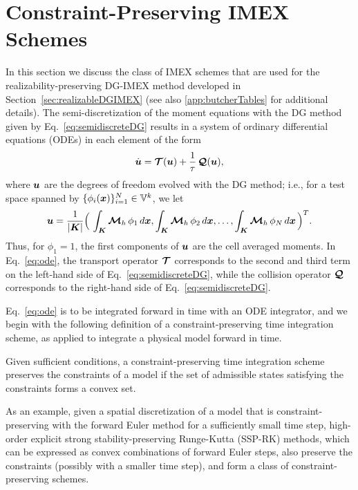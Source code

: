 \section{Constraint-Preserving IMEX Schemes}
\label{sec:imex}

In this section we discuss the class of IMEX schemes that are used for the realizability-preserving DG-IMEX method developed in Section~\ref{sec:realizableDGIMEX} (see also \ref{app:butcherTables} for additional details).  
The semi-discretization of the moment equations with the DG method given by Eq.~\eqref{eq:semidiscreteDG} results in a system of ordinary differential equations (ODEs) in each element of the form
\begin{equation}
  \dot{\boldsymbol{u}}
  =\boldsymbol{\mathcal{T}}(\boldsymbol{u})+\frac{1}{\tau}\,\boldsymbol{\mathcal{Q}}(\boldsymbol{u}),
  \label{eq:ode}
\end{equation}
where $\boldsymbol{u}$ are the degrees of freedom evolved with the DG method; i.e., for a test space spanned by $\{\phi_{i}(\boldsymbol{x})\}_{i=1}^{N}\in\mathbb{V}^{k}$, we let
\begin{equation}
  \boldsymbol{u}=\frac{1}{|\boldsymbol{K}|}\Big(\,\int_{\boldsymbol{K}}\boldsymbol{\mathcal{M}}_{h}\,\phi_{1}\,d\boldsymbol{x},\int_{\boldsymbol{K}}\boldsymbol{\mathcal{M}}_{h}\,\phi_{2}\,d\boldsymbol{x},\ldots,\int_{\boldsymbol{K}}\boldsymbol{\mathcal{M}}_{h}\,\phi_{N}\,d\boldsymbol{x}\,\Big)^{T}.
\end{equation}
Thus, for $\phi_{1}=1$, the first components of $\boldsymbol{u}$ are the cell averaged moments.  
In Eq.~\eqref{eq:ode}, the transport operator $\boldsymbol{\mathcal{T}}$ corresponds to the second and third term on the left-hand side of Eq.~\eqref{eq:semidiscreteDG}, while the collision operator $\boldsymbol{\mathcal{Q}}$ corresponds to the right-hand side of Eq.~\eqref{eq:semidiscreteDG}.  

Eq.~\eqref{eq:ode} is to be integrated forward in time with an ODE integrator, and we begin with the following definition of a constraint-preserving time integration scheme, as applied to integrate a physical model forward in time.  
\begin{define}
  Given sufficient conditions, a constraint-preserving time integration scheme preserves the constraints of a model if the set of admissible states satisfying the constraints forms a convex set.  
  \label{def:constraintPreserving}
\end{define}
As an example, given a spatial discretization of a model that is constraint-preserving with the forward Euler method for a sufficiently small time step, high-order explicit strong stability-preserving Runge-Kutta (SSP-RK) methods, which can be expressed as convex combinations of forward Euler steps, also preserve the constraints (possibly with a smaller time step), and form a class of constraint-preserving schemes.  

